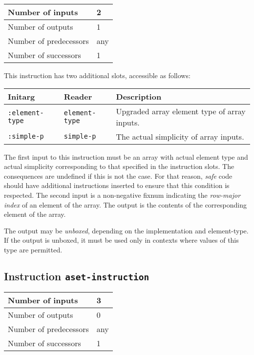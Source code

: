 \begin{tabular}{|l|l|}
\hline
Number of inputs & 2\\
\hline
Number of outputs & 1\\
\hline
Number of predecessors & any\\
\hline
Number of successors & 1\\
\hline
\end{tabular}

This instruction has two additional slots, accessible as follows:

\begin{tabular}{|l|l|l|}
  \hline
  Initarg & Reader & Description\\
  \hline\hline
  \texttt{:element-type} & \texttt{element-type} & Upgraded array element type of array inputs.\\
  \hline
  \texttt{:simple-p} & \texttt{simple-p} & The actual simplicity of array inputs.\\
  \hline
\end{tabular}

The first input to this instruction must be an array with actual
element type and actual simplicity corresponding to that specified in
the instruction slots. The consequences are undefined if this is not
the case.  For that reason, \emph{safe} code should have additional
instructions inserted to ensure that this condition is respected.  The
second input is a non-negative fixnum indicating the \emph{row-major
  index} of an element of the array.  The output is the contents of
the corresponding element of the array.

The output may be \emph{unboxed}, depending on the implementation
and element-type.  If the output is unboxed, it must be used only in
contexts where values of this type are permitted.

\subsection{Instruction \texttt{aset-instruction}}
\label{hir-instruction-aset}

\begin{tabular}{|l|l|}
  \hline
  Number of inputs & 3\\
  \hline
  Number of outputs & 0\\
  \hline
  Number of predecessors & any\\
  \hline
  Number of successors & 1\\
  \hline
\end{tabular}

